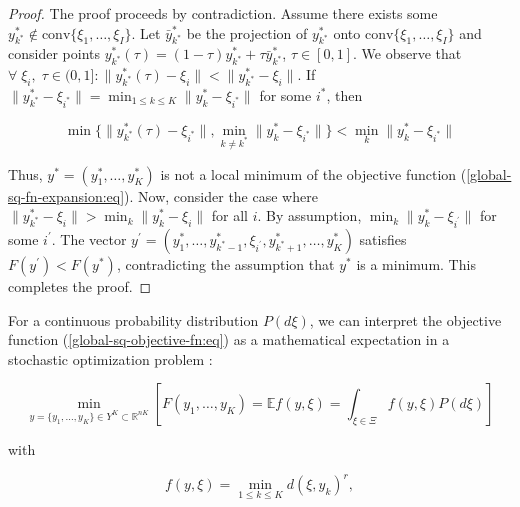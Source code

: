 \begin{proof}
    The proof proceeds by contradiction. Assume there exists some $y_{k^{*}}^{*} \notin \text{conv}\{\xi_1, \ldots, \xi_I\}$. Let $\bar{y}_{k^{*}}^{*}$ be the projection of $y_{k^{*}}^{*}$ onto $\text{conv}\{\xi_1, \ldots, \xi_I\}$ and consider points $y_{k^{*}}^{*}(\tau) = (1 - \tau)y_{k^{*}}^{*} + \tau\bar{y}_{k^{*}}^{*}$, $\tau \in [0, 1]$. We observe that $\forall\; \xi_i,\; \tau \in (0, 1]: \|y_{k^{*}}^{*}(\tau) - \xi_i\| < \|y_{k^{*}}^{*} - \xi_i\|$. If $\|y_{k^{*}}^{*} - \xi_{i^{*}}\| = \min_{1 \leq k \leq K} \|y_k^{*} - \xi_{i^{*}}\|$ for some $i^{*}$, then

    \begin{equation}
        \min\{\| y_{k^{*}}^{*}(\tau) - \xi_{i^{*}} \|, \min_{k \neq k^{*}} \| y_k^{*} - \xi_{i^{*}} \|\} < \min_k \| y_k^{*} - \xi_{i^{*}} \|
    \end{equation}

    \noindent Thus, $y^{*} = (y_1^{*}, \ldots, y_K^{*})$ is not a local minimum of the objective function (\ref{global-sq-fn-expansion:eq}). Now, consider the case where $\| y_{k^{*}}^{*} - \xi_i \| > \min_k \| y_k^{*} - \xi_i \|$ for all $i$. By assumption, $\min_k \| y_k^{*} - \xi_{i^{\prime}} \|$ for some $i^{\prime}$. The vector $y^{\prime} = (y_1^{*}, \ldots, y_{k^{*} - 1}^{*}, \xi_{i^{\prime}}, y_{k^{*} + 1}^{*}, \ldots, y_K^{*})$ satisfies $F(y^{\prime}) < F(y^{*})$, contradicting the assumption that $y^{*}$ is a minimum. This completes the proof.
\end{proof}

For a continuous probability distribution $P(d\xi)$, we can interpret the objective function (\ref{global-sq-objective-fn:eq}) as a mathematical expectation in a stochastic optimization problem \cite{ermoliev1976stochastic,Newton_Yousefian_Pasupathy_2018,Norkin_Kozyriev_Norkin_2024}:

\begin{equation}
    \label{smooth-stoch-opt-problem:eq}
    \min_{y = \{ y_1, \ldots, y_K \} \in Y^K \subset \mathbb{R}^{nK}} 
    \left[F(y_1, \ldots, y_K) = \mathbb{E} f(y, \xi) = \int_{\xi \in \Xi} f(y, \xi) P(d \xi)\right]
\end{equation}

\noindent with 

\begin{equation}
    \label{smooth-stoch-fn-expansion:eq}
    f(y, \xi) =  \min_{1 \leq k \leq K} d(\xi, y_k)^r, 
\end{equation}

